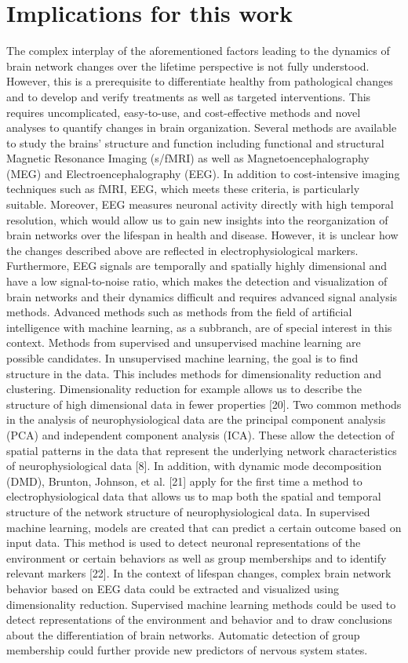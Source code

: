 \section{Implications for this work}
The complex interplay of the aforementioned factors leading to the dynamics of brain network changes over the lifetime perspective is not fully understood. However, this is a prerequisite to differentiate healthy from pathological changes and to develop and verify treatments as well as targeted interventions. This requires uncomplicated, easy-to-use, and cost-effective methods and novel analyses to quantify changes in brain organization. Several methods are available to study the brains' structure and function including functional and structural Magnetic Resonance Imaging (s/fMRI) as well as Magnetoencephalography (MEG) and Electroencephalography (EEG). In addition to cost-intensive imaging techniques such as fMRI, EEG, which meets these criteria, is particularly suitable.
Moreover, EEG measures neuronal activity directly with high temporal resolution, which would allow us to gain new insights into the reorganization of brain networks over the lifespan in health and disease. However, it is unclear how the changes described above are reflected in electrophysiological markers. Furthermore, EEG signals are temporally and spatially highly dimensional and have a low signal-to-noise ratio, which makes the detection and visualization of brain networks and their dynamics difficult and requires advanced signal analysis methods. 
Advanced methods such as methods from the field of artificial intelligence with machine learning, as a subbranch, are of special interest in this context. Methods from supervised and unsupervised machine learning are possible candidates. In unsupervised machine learning, the goal is to find structure in the data. This includes methods for dimensionality reduction and clustering. Dimensionality reduction for example allows us to describe the structure of high dimensional data in fewer properties [20]. Two common methods in the analysis of neurophysiological data are the principal component analysis (PCA) and independent component analysis (ICA). These allow the detection of spatial patterns in the data that represent the underlying network characteristics of neurophysiological data [8]. In addition, with dynamic mode decomposition (DMD), Brunton, Johnson, et al. [21] apply for the first time a method to electrophysiological data that allows us to map both the spatial and temporal structure of the network structure of neurophysiological data.
In supervised machine learning, models are created that can predict a certain outcome based on input data. This method is used to detect neuronal representations of the environment or certain behaviors as well as group memberships and to identify relevant markers [22].
In the context of lifespan changes, complex brain network behavior based on EEG data could be extracted and visualized using dimensionality reduction. Supervised machine learning methods could be used to detect representations of the environment and behavior and to draw conclusions about the differentiation of brain networks. Automatic detection of group membership could further provide new predictors of nervous system states.

